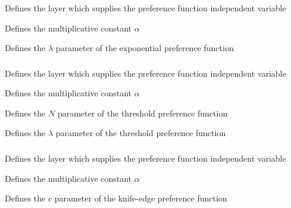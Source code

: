 \subsubsection[Exponential]{}

 {Defines the layer which supplies the preference function independent variable}

 {Defines the multiplicative constant $\alpha$}

 {Defines the $\lambda$ parameter of the exponential preference function}

\subsubsection[Threshold]{}

 {Defines the layer which supplies the preference function independent variable}

 {Defines the multiplicative constant $\alpha$}

 {Defines the $N$ parameter of the threshold preference function}

 {Defines the $\lambda$ parameter of the threshold preference function}

\subsubsection[Knife-edge]{}

 {Defines the layer which supplies the preference function independent variable}

 {Defines the multiplicative constant $\alpha$}

 {Defines the $c$ parameter of the knife-edge preference function}

